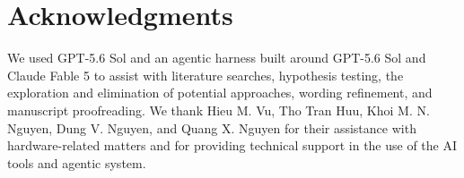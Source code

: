 \documentclass[11pt,reqno]{amsart}
\numberwithin{equation}{section}
\theoremstyle{plain}
\begin{document}



\renewcommand{\sectionname}{}
\section*{Acknowledgments}
We used GPT-5.6 Sol and an agentic harness built around GPT-5.6 Sol and Claude Fable 5 to assist with literature searches, hypothesis testing, the exploration and elimination of potential approaches, wording refinement, and manuscript proofreading. We thank Hieu M. Vu, Tho Tran Huu, Khoi M. N. Nguyen, Dung V. Nguyen, and Quang X. Nguyen for their assistance with hardware-related matters and for providing technical support in the use of the AI tools and agentic system. %



\end{document}
